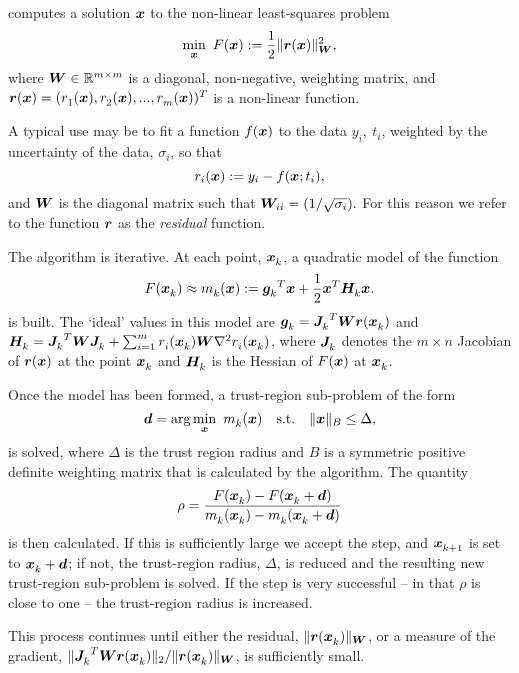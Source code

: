 {\tt \fullpackagename} computes a solution $\vx$ to the non-linear least-squares problem
\begin{equation}
\min_\vx \  F(\vx) := \frac{1}{2}\| \vr(\vx) \|_{\vW}^2,
\label{eq:nlls_problem}
\end{equation}
where $\vW\in\mathbb{R}^{m\times m}$ is a diagonal, non-negative, weighting matrix, and $\vr(\vx) =(\comp[1]{r}(\vx), \comp[2]{r}(\vx),...,\comp[m]{r}(\vx))^T$ is a non-linear function.

A typical use may be to fit a function $f(\vx)$ to the data $y_i, \ t_i$, weighted by the uncertainty of the data, $\sigma_i$, so that
$$r_i(\vx) := y_i - f(\vx;t_i),$$
and $\vW$ is the diagonal matrix such that $\vW_{ii} = (1/\sqrt{\sigma_i}).$  For this reason 
we refer to the function $\vr$ as the \emph{residual} function.

The algorithm is iterative.
At each point, $\iter{\vx}$, a quadratic model of the function
\[
F(\iter{\vx}) \approx \iter{m}(\vx) := {\iter{\vg}}^T\vx + \frac{1}{2} {\vx}^T \iter{\vH} \vx.
\]
is built.
The `ideal' values in this model are $\iter{\vg} = {\iter{\vJ}}^T\vW\vr(\iter{\vx})$ and
$\iter{\vH} = {\iter{\vJ}}^T\vW\iter{\vJ} + \sum_{i = 1}^m \comp{r}(\iter{\vx}) \vW\nabla^2 \comp{r}(\iter{\vx})$,
where $\iter{\vJ}$ denotes the $m \times n$ Jacobian of $\vr(\vx)$ at the point $\iter{\vx}$
and $\iter{\vH}$ is the Hessian of $F(\vx)$ at $\iter{\vx}$.

Once the model has been formed, a trust-region sub-problem of the form
\begin{equation}
\vd = \arg \min_{\vx} \ \iter{m} (\vx) \quad \mathrm{s.t.} \quad  \|\vx\|_B \leq \Delta,\label{eq:tr_subproblem}
\end{equation}
is solved,
where $\Delta$ is the trust region radius and $B$ is a symmetric positive definite weighting matrix that is calculated by the algorithm.
The quantity
\[\rho = \frac{F(\iter{\vx}) - F(\iter{\vx} + \vd)}{\iter{m}(\iter{\vx}) - \iter{m}(\iter{\vx} + \vd)}\]
is then calculated.
If this is sufficiently large we accept the step, and $\iter[k+1]{\vx}$ is set to $\iter{\vx} + \vd$; if not, the trust-region radius, $\Delta$,
is reduced and  the resulting new trust-region sub-problem is solved.  If the step is very successful -- in that $\rho$ is close to one --
the trust-region radius is increased.

This process continues until either the residual, $\|\vr(\iter{\vx})\|_\vW$, or a measure of the gradient,
$\|{\iter{\vJ}}^T\vW\vr(\iter{\vx})\|_2 / \|\vr(\iter{\vx})\|_\vW$, is sufficiently small.


